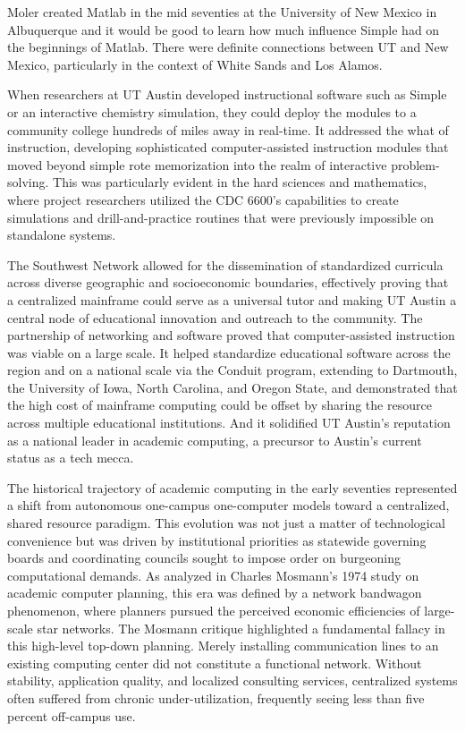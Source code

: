 Moler created Matlab in the mid seventies at the University of New Mexico in Albuquerque and it would be good to learn how much influence Simple had on the beginnings of Matlab. There were definite connections between UT and New Mexico, particularly in the context of White Sands and Los Alamos.

When researchers at UT Austin developed instructional software such as Simple or an interactive chemistry simulation, they could deploy the modules to a community college hundreds of miles away in real-time. It addressed the what of instruction, developing sophisticated computer-assisted instruction modules that moved beyond simple rote memorization into the realm of interactive problem-solving. This was particularly evident in the hard sciences and mathematics, where project researchers utilized the CDC 6600’s capabilities to create simulations and drill-and-practice routines that were previously impossible on standalone systems. 

The Southwest Network allowed for the dissemination of standardized curricula across diverse geographic and socioeconomic boundaries, effectively proving that a centralized mainframe could serve as a universal tutor and making UT Austin a central node of educational innovation and outreach to the community. The partnership of networking and software proved that computer-assisted instruction was viable on a large scale. It helped standardize educational software across the region and on a national scale via the Conduit program, extending to Dartmouth, the University of Iowa, North Carolina, and Oregon State, and demonstrated that the high cost of mainframe computing could be offset by sharing the resource across multiple educational institutions. And it solidified UT Austin’s reputation as a national leader in academic computing, a precursor to Austin's current status as a tech mecca. 

The historical trajectory of academic computing in the early seventies represented a shift from autonomous one-campus one-computer models toward a centralized, shared resource paradigm. This evolution was not just a matter of technological convenience but was driven by institutional priorities as statewide governing boards and coordinating councils sought to impose order on burgeoning computational demands. As analyzed in Charles Mosmann’s 1974 study on academic computer planning, this era was defined by a network bandwagon phenomenon, where planners pursued the perceived economic efficiencies of large-scale star networks. The Mosmann critique highlighted a fundamental fallacy in this high-level top-down planning. Merely installing communication lines to an existing computing center did not constitute a functional network. Without stability, application quality, and localized consulting services, centralized systems often suffered from chronic under-utilization, frequently seeing less than five percent off-campus use. 

